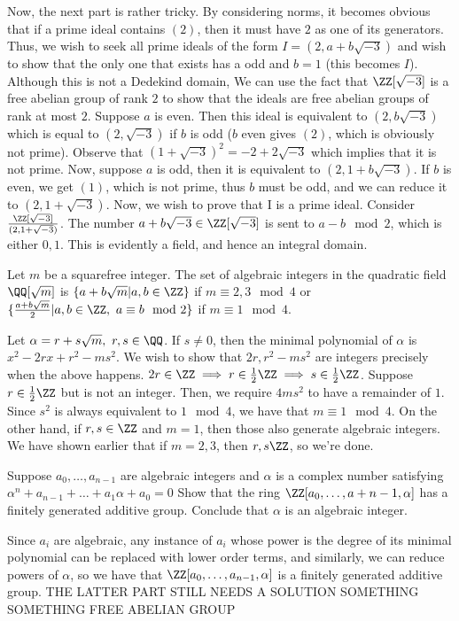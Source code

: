 Now, the next part is rather tricky. By considering norms, it becomes obvious that if a prime ideal contains \((2)\), then it must have \(2\) as one of its generators. Thus, we wish to seek all prime ideals of the form \(I=(2,a+b\sqrt{-3})\) and wish to show that the only one that exists has a odd and \(b=1\) (this becomes \(I\)). Although this is not a Dedekind domain, We can use the fact that \(\ZZ[\sqrt{-3}]\) is a free abelian group of rank \(2\) to show that the ideals are free abelian groups of rank at most \(2\). Suppose \(a\) is even. Then this ideal is equivalent to \((2,b\sqrt{-3})\) which is equal to \((2,\sqrt{-3})\) if \(b\) is odd (\(b\) even gives \((2)\), which is obviously not prime). Observe that \((1+\sqrt{-3})^2=-2+2\sqrt{-3}\) which implies that it is not prime. Now, suppose \(a\) is odd, then it is equivalent to \((2,1+b\sqrt{-3})\). If \(b\) is even, we get \((1)\), which is not prime, thus \(b\) must be odd, and we can reduce it to \((2,1+\sqrt{-3})\). Now, we wish to prove that I is a prime ideal. Consider \(\frac{\ZZ[\sqrt{-3}]}{(2,1+\sqrt{-3})}\). The number \(a+b\sqrt{-3} \in \ZZ[\sqrt{-3}]\) is sent to \(a-b \mod 2\), which is either \(0,1\). This is evidently a field, and hence an integral domain.
\begin{problem}
Let \(m\) be a squarefree integer. The set of algebraic integers in the quadratic field \(\QQ[\sqrt{m}]\) is \(\{a+b\sqrt{m}| a,b \in \ZZ\}\) if \( m \equiv 2,3 \mod 4\) or \(\{\frac{a+b\sqrt{m}}{2} | a,b \in \ZZ, \ a\equiv b \mod 2\}\) if \(m \equiv 1 \mod 4\).
\end{problem}
Let \(\alpha = r+s\sqrt{m},\ r,s \in \QQ\). If \(s \ne 0\), then the minimal polynomial of \(\alpha\) is \(x^2-2rx+r^2-ms^2\). We wish to show that \(2r, r^2-ms^2\) are integers precisely when the above happens. \(2r \in \ZZ \implies r \in \frac{1}{2}\ZZ \implies s \in \frac{1}{2}\ZZ\). Suppose \(r \in \frac{1}{2}\ZZ\) but is not an integer. Then, we require \(4ms^2\) to have a remainder of \(1\). Since \(s^2\) is always equivalent to \(1 \mod 4\), we have that \(m \equiv 1 \mod 4\). On the other hand, if \(r,s \in \ZZ\) and \(m=1\), then those also generate algebraic integers. We have shown earlier that if \(m=2,3\), then \(r,s \ZZ\), so we're done.

\begin{problem}
Suppose \(a_0,\dots,a_{n-1}\) are algebraic integers and \(\alpha\) is a complex number satisfying \(\alpha^n+a_{n-1}+\dots + a_1\alpha +a_0 =0\) Show that the ring \(\ZZ[a_0,\dots,a+{n-1},\alpha]\) has a finitely generated additive group. Conclude that \(\alpha\) is an algebraic integer.
\end{problem}
Since \(a_i\) are algebraic, any instance of \(a_i\) whose power is the degree of its minimal polynomial can be replaced with lower order terms, and similarly, we can reduce powers of \(\alpha\), so we have that \(\ZZ[a_0, \dots, a_{n-1}, \alpha]\) is a finitely generated additive group. THE LATTER PART STILL NEEDS A SOLUTION SOMETHING SOMETHING FREE ABELIAN GROUP

